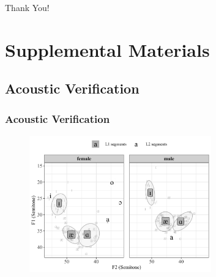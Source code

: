 \documentclass{beamer}
\begin{document}

\begin{frame}
\Huge{\centerline{Thank You!}}
\end{frame}


\section{Supplemental Materials}
\subsection{Acoustic Verification}
\begin{frame}
\frametitle{Acoustic Verification}
\begin{figure}
\includegraphics[width=0.7\textwidth]{figures/sup/smallplastic.png}
\end{figure}
\end{frame}
\end{document}
